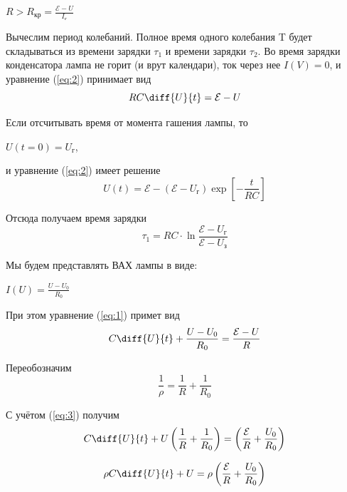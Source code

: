 \begin{center}
$R>R_{\text{кр}}=\frac{\mathcal{E}-U}{I_{\text{г}}}$
\end{center}
Вычеслим период колебаний. Полное время одного колебания T будет складываться из времени зарядки $\tau_1$ и времени зарядки $\tau_2$. Во время зарядки конденсатора лампа не горит (и врут календари), ток через нее $I(V)=0$, и уравнение (\ref{eq:2}) принимает вид
\begin{equation}
\label{eq:3}	
	RC\diff{U}{t}=\mathcal{E}-U
	\end{equation}

Если отсчитывать время от момента гашения лампы, то 
\begin{center}
$U(t=0)=U_{\text{г}}$,
	\end{center}

и уравнение (\ref{eq:2}) имеет решение
\begin{equation}
	U(t)= \mathcal{E}-(\mathcal{E}-U_{\text{г}}) \exp{\left[- \frac{t}{RC} \right] }
	\end{equation}

Отсюда получаем время зарядки
\begin{equation}
\label{tau:1}
	\tau_1=RC\cdot \ln \frac {\mathcal{E}-U_{\text{г}}} 	{\mathcal{E}-U_{\text{з}}}
	\end{equation}

Мы будем представлять ВАХ лампы в виде:


\begin{center}
$I(U)=\frac{U-U_0}{R_0}$
	\end{center}

При этом уравнение (\ref{eq:1}) примет вид
\begin{equation}
C\diff{U}{t}+\frac{U-U_0}{R_0} = \frac{\mathcal{E}-U}{R}
	\end{equation}

Переобозначим 
\begin{equation}
\label{eq:3}
\frac{1}{\rho}=\frac{1}{R}+\frac{1}{R_0}
	\end{equation}

С учётом (\ref{eq:3}) получим
\begin{equation}
	C \diff{U}{t} +U \left( \frac{1}{R}+\frac{1}{R_0} \right)= \left( \frac{\mathcal{E}}{R}+\frac{U_0}{R_0}\right)
	\end{equation}

\begin{equation}
	\label{eq:4}
	\rho C \diff{U}{t}+U= \rho \left( \frac{\mathcal{E}}{R}+\frac{U_0}{R_0}\right)
	\end{equation}

